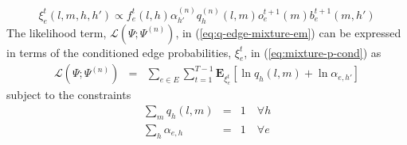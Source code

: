 \documentclass{bioinfo}
\begin{document}
\begin{equation}
  \label{eq:mixture-p-cond}
  \xi^t_e(l,m,h,h') \propto f^t_e(l,h)\alpha_{h'}^{(n)} q^{(n)}_h(l,m)
  o^{t+1}_e(m) b_e^{t+1}(m, h')
\end{equation}
The likelihood term, $ {\mathcal L}(\Psi; \Psi^{(n)})$, in (\ref{eq:q-edge-mixture-em}) can be expressed
in terms of the conditioned edge probabilities, $\xi^t_e$, in
(\ref{eq:mixture-p-cond}) as 
\begin{eqnarray}
  \label{eq:mixture-L-edge}
  {\mathcal L}(\Psi; \Psi^{(n)}) &=& \sum_{e\in E}\sum_{t=1}^{T-1}
  \mathbf{E}_{\xi^t_e}[\ln q_h(l, m) + \ln \alpha_{e,h'}]
\end{eqnarray}
subject to the constraints
\begin{eqnarray}
  \label{eq:mixture-q-constraint} \sum_{m} q_h(l,m) &=& 1 \quad\forall h \\
   \label{eq:mixture-alpha-constraint} \sum_{h} \alpha_{e,h} &=& 1 \quad\forall e
\end{eqnarray}
\end{document}
